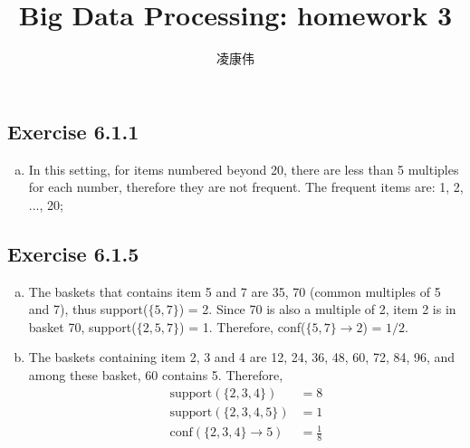 \documentclass[11pt]{article}
\title{Big Data Processing: homework 3}
\author{凌康伟 \qquad 5140219295}
\begin{document}
\maketitle

\subsection*{Exercise 6.1.1}
\begin{enumerate}[(a)]
\item In this setting, for items numbered beyond 20, there are less than 5
  multiples for each number, therefore they are not frequent. The frequent items
  are: 1, 2, ..., 20;
\end{enumerate}

\subsection*{Exercise 6.1.5}
\begin{enumerate}[(a)]
\item The baskets that contains item 5 and 7 are 35, 70 (common multiples of 5
  and 7), thus support($\{5, 7\}$) = 2. Since 70 is also a multiple of 2, item 2
  is in basket 70, support($\{2, 5, 7\}$) = 1. Therefore, conf($\{5, 7\}
  \rightarrow 2$) = $1/2$.
\item The baskets containing item 2, 3 and 4 are 12, 24, 36, 48, 60, 72, 84, 96,
  and among these basket, 60 contains 5. Therefore,
  \begin{align*}
    \text{support}(\{2, 3, 4\}) &= 8 \\
    \text{support}(\{2, 3, 4, 5\}) &= 1 \\
    \text{conf}(\{2, 3, 4\} \rightarrow 5) &= \frac{1}{8}
  \end{align*}
\end{enumerate}
\end{document}
